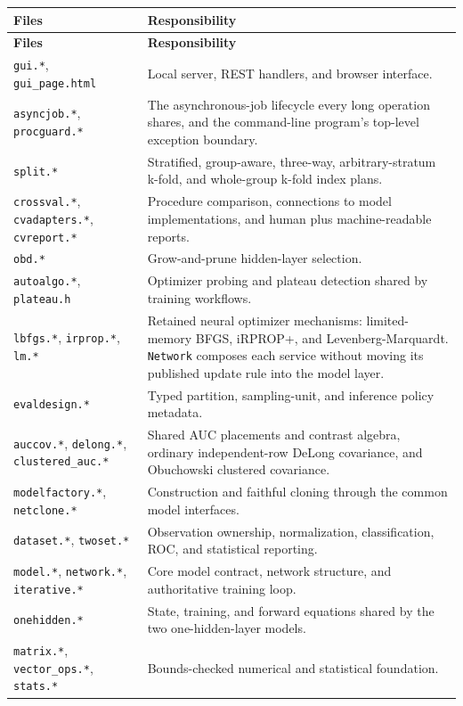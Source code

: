 \begin{longtable}{|>{\raggedright\arraybackslash}p{1.05in}|>{\raggedright\arraybackslash}p{3.15in}|}
\hline
\textbf{Files} & \textbf{Responsibility} \\ \hline
\endfirsthead
\hline
\textbf{Files} & \textbf{Responsibility} \\ \hline
\endhead
\texttt{gui.*},
\texttt{gui\_page.html} &
Local server, REST handlers, and browser interface. \\ \hline
\texttt{asyncjob.*},
\texttt{procguard.*} &
The asynchronous-job lifecycle every long operation shares, and the
command-line program's top-level exception boundary. \\ \hline
\texttt{split.*} &
Stratified, group-aware, three-way, arbitrary-stratum k-fold, and
whole-group k-fold index plans. \\ \hline
\texttt{crossval.*},
\texttt{cvadapters.*},
\texttt{cvreport.*} &
Procedure comparison, connections to model implementations, and
human plus machine-readable reports. \\ \hline
\texttt{obd.*} &
Grow-and-prune hidden-layer selection. \\ \hline
\texttt{autoalgo.*},
\texttt{plateau.h} &
Optimizer probing and plateau detection shared by training
workflows. \\ \hline
\texttt{lbfgs.*},
\texttt{irprop.*},
\texttt{lm.*} &
Retained neural optimizer mechanisms: limited-memory BFGS, iRPROP+, and
Levenberg-Marquardt.  \texttt{Network} composes each service without moving
its published update rule into the model layer. \\ \hline
\texttt{evaldesign.*} &
Typed partition, sampling-unit, and inference policy metadata. \\ \hline
\texttt{auccov.*},
\texttt{delong.*},
\texttt{clustered\_auc.*} &
Shared AUC placements and contrast algebra, ordinary independent-row
DeLong covariance, and Obuchowski clustered covariance. \\ \hline
\texttt{modelfactory.*},
\texttt{netclone.*} &
Construction and faithful cloning through the common model
interfaces. \\ \hline
\texttt{dataset.*},
\texttt{twoset.*} &
Observation ownership, normalization, classification, ROC, and
statistical reporting. \\ \hline
\texttt{model.*},
\texttt{network.*},
\texttt{iterative.*} &
Core model contract, network structure, and authoritative training
loop. \\ \hline
\texttt{onehidden.*} &
State, training, and forward equations shared by the two
one-hidden-layer models. \\ \hline
\texttt{matrix.*},
\texttt{vector\_ops.*},
\texttt{stats.*} &
Bounds-checked numerical and statistical foundation. \\ \hline
\end{longtable}
